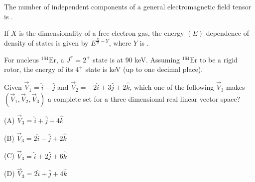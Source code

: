 \item The number of independent components of a general electromagnetic field tensor is \underline{\hspace{2cm}}.
    \bigskip

\item If $X$ is the dimensionality of a free electron gas, the energy $(E)$ dependence of density of states is given by $E^{\frac{X}{2}-Y}$, where $Y$ is \underline{\hspace{2cm}}.
    \bigskip

\item For nucleus $^{164}\text{Er}$, a $J^{\pi} = 2^+$ state is at 90 keV. Assuming $^{164}\text{Er}$ to be a rigid rotor, the energy of its $4^+$ state is \underline{\hspace{2cm}} keV (up to one decimal place).

\bigskip

\item Given $\vec{V}_1 = \hat{i} - \hat{j}$ and $\vec{V}_2 = -2\hat{i} + 3\hat{j} + 2\hat{k}$, which one of the following $\vec{V}_3$ makes $(\vec{V}_1, \vec{V}_2, \vec{V}_3)$ a complete set for a three dimensional real linear vector space?
\begin{enumerate}
    \begin{multicols}{2}
        \item[(A)] $\vec{V}_3 = \hat{i} + \hat{j} + 4\hat{k}$
        \item[(B)] $\vec{V}_3 = 2\hat{i} - \hat{j} + 2\hat{k}$
        \item[(C)] $\vec{V}_3 = \hat{i} + 2\hat{j} + 6\hat{k}$
        \item[(D)] $\vec{V}_3 = 2\hat{i} + \hat{j} + 4\hat{k}$
    \end{multicols}
\end{enumerate}

